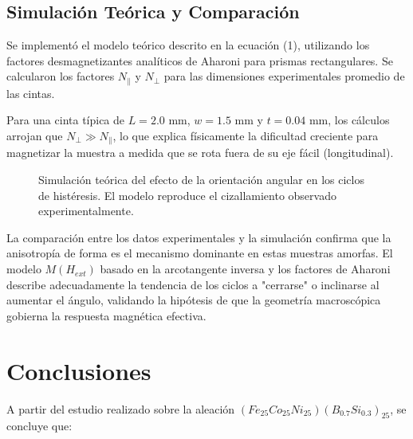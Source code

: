 \subsection{Simulación Teórica y Comparación}

Se implementó el modelo teórico descrito en la ecuación (1), utilizando los factores desmagnetizantes analíticos de Aharoni para prismas rectangulares. Se calcularon los factores $N_{\parallel}$ y $N_{\perp}$ para las dimensiones experimentales promedio de las cintas.

Para una cinta típica de $L=2.0$ mm, $w=1.5$ mm y $t=0.04$ mm, los cálculos arrojan que $N_{\perp} \gg N_{\parallel}$, lo que explica físicamente la dificultad creciente para magnetizar la muestra a medida que se rota fuera de su eje fácil (longitudinal).

\begin{figure}[H]
    \centering
    \caption{Simulación teórica del efecto de la orientación angular en los ciclos de histéresis. El modelo reproduce el cizallamiento observado experimentalmente.}
    \label{fig:simulacion_aharoni}
\end{figure}

La comparación entre los datos experimentales y la simulación confirma que la anisotropía de forma es el mecanismo dominante en estas muestras amorfas. El modelo $M(H_{ext})$ basado en la arcotangente inversa y los factores de Aharoni describe adecuadamente la tendencia de los ciclos a "cerrarse" o inclinarse al aumentar el ángulo, validando la hipótesis de que la geometría macroscópica gobierna la respuesta magnética efectiva.

\section{Conclusiones}

A partir del estudio realizado sobre la aleación $(Fe_{25}Co_{25}Ni_{25})(B_{0.7}Si_{0.3})_{25}$, se concluye que:

